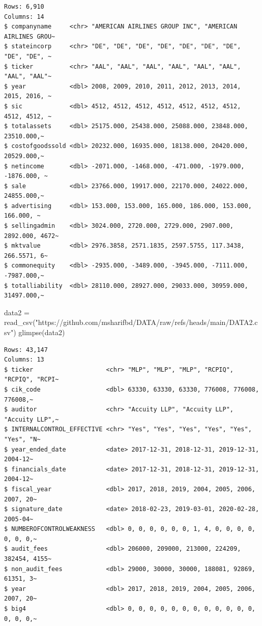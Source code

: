 \documentclass[
  letterpaper,
  DIV=11,
  numbers=noendperiod]{scrreprt}
\newenvironment{Shaded}{\begin{snugshade}}{\end{snugshade}}
\newcommand{\FunctionTok}[1]{\textcolor[rgb]{0.28,0.35,0.67}{#1}}
\newcommand{\NormalTok}[1]{\textcolor[rgb]{0.00,0.23,0.31}{#1}}
\newcommand{\OtherTok}[1]{\textcolor[rgb]{0.00,0.23,0.31}{#1}}
\newcommand{\StringTok}[1]{\textcolor[rgb]{0.13,0.47,0.30}{#1}}
\begin{document}
\begin{verbatim}
Rows: 6,910
Columns: 14
$ companyname     <chr> "AMERICAN AIRLINES GROUP INC", "AMERICAN AIRLINES GROU~
$ stateincorp     <chr> "DE", "DE", "DE", "DE", "DE", "DE", "DE", "DE", "DE", ~
$ ticker          <chr> "AAL", "AAL", "AAL", "AAL", "AAL", "AAL", "AAL", "AAL"~
$ year            <dbl> 2008, 2009, 2010, 2011, 2012, 2013, 2014, 2015, 2016, ~
$ sic             <dbl> 4512, 4512, 4512, 4512, 4512, 4512, 4512, 4512, 4512, ~
$ totalassets     <dbl> 25175.000, 25438.000, 25088.000, 23848.000, 23510.000,~
$ costofgoodssold <dbl> 20232.000, 16935.000, 18138.000, 20420.000, 20529.000,~
$ netincome       <dbl> -2071.000, -1468.000, -471.000, -1979.000, -1876.000, ~
$ sale            <dbl> 23766.000, 19917.000, 22170.000, 24022.000, 24855.000,~
$ advertising     <dbl> 153.000, 153.000, 165.000, 186.000, 153.000, 166.000, ~
$ sellingadmin    <dbl> 3024.000, 2720.000, 2729.000, 2907.000, 2892.000, 4672~
$ mktvalue        <dbl> 2976.3858, 2571.1835, 2597.5755, 117.3438, 266.5571, 6~
$ commonequity    <dbl> -2935.000, -3489.000, -3945.000, -7111.000, -7987.000,~
$ totalliability  <dbl> 28110.000, 28927.000, 29033.000, 30959.000, 31497.000,~
\end{verbatim}

\begin{Shaded}
\begin{Highlighting}[]
\NormalTok{data2 }\OtherTok{=} \FunctionTok{read\_csv}\NormalTok{(}\StringTok{"https://github.com/msharifbd/DATA/raw/refs/heads/main/DATA2.csv"}\NormalTok{)}
\FunctionTok{glimpse}\NormalTok{(data2)}
\end{Highlighting}
\end{Shaded}

\begin{verbatim}
Rows: 43,147
Columns: 13
$ ticker                    <chr> "MLP", "MLP", "MLP", "RCPIQ", "RCPIQ", "RCPI~
$ cik_code                  <dbl> 63330, 63330, 63330, 776008, 776008, 776008,~
$ auditor                   <chr> "Accuity LLP", "Accuity LLP", "Accuity LLP",~
$ INTERNALCONTROL_EFFECTIVE <chr> "Yes", "Yes", "Yes", "Yes", "Yes", "Yes", "N~
$ year_ended_date           <date> 2017-12-31, 2018-12-31, 2019-12-31, 2004-12~
$ financials_date           <date> 2017-12-31, 2018-12-31, 2019-12-31, 2004-12~
$ fiscal_year               <dbl> 2017, 2018, 2019, 2004, 2005, 2006, 2007, 20~
$ signature_date            <date> 2018-02-23, 2019-03-01, 2020-02-28, 2005-04~
$ NUMBEROFCONTROLWEAKNESS   <dbl> 0, 0, 0, 0, 0, 0, 1, 4, 0, 0, 0, 0, 0, 0, 0,~
$ audit_fees                <dbl> 206000, 209000, 213000, 224209, 382454, 4155~
$ non_audit_fees            <dbl> 29000, 30000, 30000, 188081, 92869, 61351, 3~
$ year                      <dbl> 2017, 2018, 2019, 2004, 2005, 2006, 2007, 20~
$ big4                      <dbl> 0, 0, 0, 0, 0, 0, 0, 0, 0, 0, 0, 0, 0, 0, 0,~
\end{verbatim}
\end{document}
